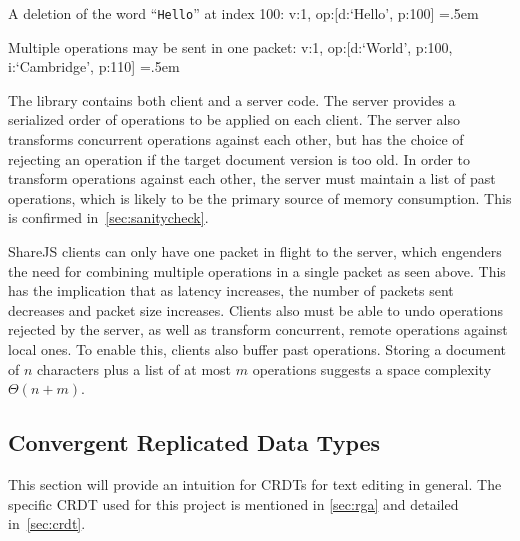 \documentclass[12pt,a4paper,twoside,openright]{report}
\newenvironment{lcverbatim}
 {\SaveVerbatim{cverb}}
 {\endSaveVerbatim
  \flushleft\fboxrule=0pt\fboxsep=.5em
  \colorbox{cverbbg}{%
    \makebox[\dimexpr\linewidth-2\fboxsep][l]{\BUseVerbatim{cverb}}%
  }
  \endflushleft
}
\begin{document}
	A deletion of the word ``\texttt{Hello}'' at index 100:
\begin{lcverbatim}
{v:1, op:[{d:`Hello', p:100}]}
\end{lcverbatim}

	Multiple operations may be sent in one packet:
\begin{lcverbatim}
{v:1, op:[{d:`World', p:100}, {i:`Cambridge', p:110}]}
\end{lcverbatim}

\vspace{5mm}

	The library contains both client and a server code. The server provides a serialized order of operations to be applied on each client. The server also transforms concurrent operations against each other, but has the choice of rejecting an operation if the target document version is too old. In order to transform operations against each other, the server must maintain a list of past operations, which is likely to be the primary source of memory consumption. This is confirmed in~\cref{sec:sanitycheck}.
	
	ShareJS clients can only have one packet in flight to the server, which engenders the need for combining multiple operations in a single packet as seen above. This has the implication that as latency increases, the number of packets sent decreases and packet size increases. Clients also must be able to undo operations rejected by the server, as well as transform concurrent, remote operations against local ones. To enable this, clients also buffer past operations. Storing a document of $n$ characters plus a list of at most $m$ operations suggests a space complexity $\Theta (n + m)$.


	\subsection{Convergent Replicated Data Types} \label{sec:crdtoverview}
	
	
	This section will provide an intuition for CRDTs for text editing in general. The specific CRDT used for this project is mentioned in \cref{sec:rga} and detailed in~\cref{sec:crdt}.
\end{document}
